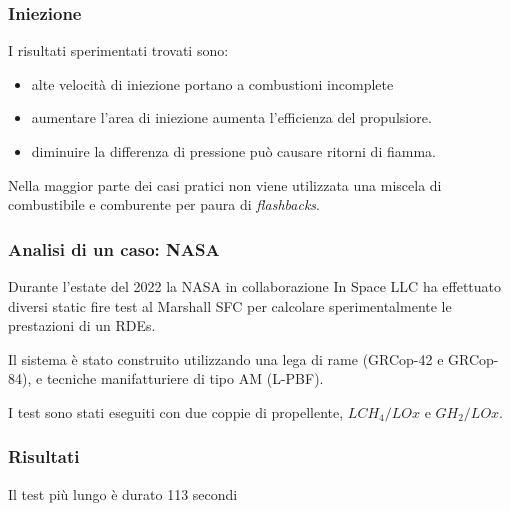 \begin{frame}
  \frametitle{Iniezione}
  I risultati sperimentati trovati sono:
  \begin{itemize}
    \item alte velocità di iniezione portano a combustioni incomplete
    \item aumentare l'area di iniezione aumenta l'efficienza del propulsiore.
    \item diminuire la differenza di pressione può causare ritorni di fiamma.
  \end{itemize}
  Nella maggior parte dei casi pratici non viene utilizzata una miscela di combustibile e comburente per paura di \textit{flashbacks}. 
\end{frame}
\begin{frame}
  \frametitle{Analisi di un caso: NASA}
  Durante l'estate del 2022 la NASA in collaborazione In Space LLC ha effettuato diversi static fire test al Marshall SFC per calcolare sperimentalmente le prestazioni di un RDEs.

  Il sistema è stato construito utilizzando una lega di rame (GRCop-42 e GRCop-84), e tecniche manifatturiere di tipo AM (L-PBF).
  
  I test sono stati eseguiti con due coppie di propellente, $ LCH_4/LOx $ e $ GH_2/LOx $.  
\end{frame}
\begin{frame}
  \frametitle{Risultati}
  Il test più lungo è durato 113 secondi
\end{frame}

